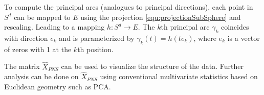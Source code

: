 To compute the principal arcs (analogues to principal directions), 
each point in $S^d$ can be mapped to $E$ using the projection \ref{equ:projectionSubSphere} and rescaling.
Leading to a mapping $h: S^d \rightarrow E$.
The $k$th principal arc $\gamma_k$ coincides with direction $e_k$ and is parameterized
by $\gamma_k(t) = h(te_k)$, where $e_k$ is a vector of zeros with 1 at the $k$th position. 

The matrix $\hat X_{PNS}$ can be used to visualize the structure of the data.
Further analysis can be done on $\hat X_{PNS}$ using conventional multivariate statistics based on Euclidean geometry such as PCA.

